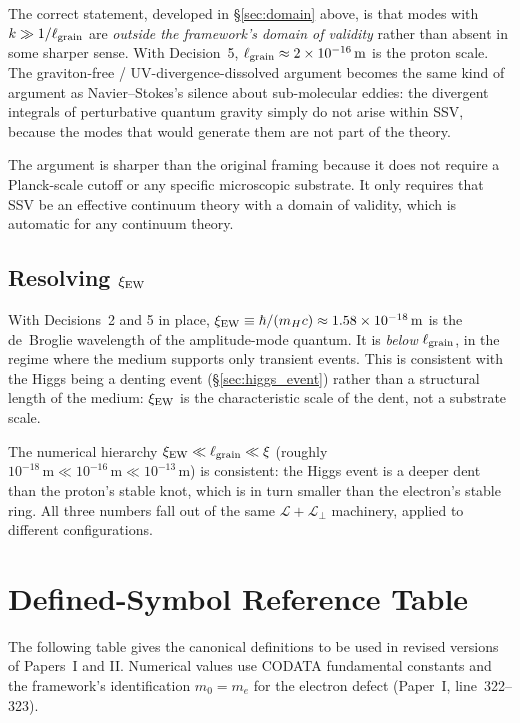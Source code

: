 \documentclass[11pt,a4paper]{article}
\begin{document}
The correct statement, developed in \S\ref{sec:domain} above, is that
modes with $k \gg 1/\ell_{\rm grain}$ are \emph{outside the framework's
domain of validity} rather than absent in some sharper sense.  With
Decision~5, $\ell_{\rm grain} \approx 2\times 10^{-16}\,\mathrm{m}$ is
the proton scale.  The graviton-free / UV-divergence-dissolved argument
becomes the same kind of argument as Navier--Stokes's silence about
sub-molecular eddies: the divergent integrals of perturbative quantum
gravity simply do not arise within SSV, because the modes that would
generate them are not part of the theory.

The argument is sharper than the original framing because it does not
require a Planck-scale cutoff or any specific microscopic substrate.
It only requires that SSV be an effective continuum theory with a
domain of validity, which is automatic for any continuum theory.

\subsection{Resolving $\xi_{\rm EW}$}

With Decisions~2 and 5 in place, $\xi_{\rm EW} \equiv \hbar/(m_H c)
\approx 1.58\times 10^{-18}\,\mathrm{m}$ is the de~Broglie wavelength of
the amplitude-mode quantum.  It is \emph{below} $\ell_{\rm grain}$, in
the regime where the medium supports only transient events.  This is
consistent with the Higgs being a denting event (\S\ref{sec:higgs_event})
rather than a structural length of the medium: $\xi_{\rm EW}$ is the
characteristic scale of the dent, not a substrate scale.

The numerical hierarchy $\xi_{\rm EW} \ll \ell_{\rm grain} \ll \xi$
(roughly $10^{-18}\,\mathrm{m} \ll 10^{-16}\,\mathrm{m} \ll
10^{-13}\,\mathrm{m}$) is consistent: the Higgs event is a deeper
dent than the proton's stable knot, which is in turn smaller than the
electron's stable ring.  All three numbers fall out of the same
$\mathcal{L}+\mathcal{L}_\perp$ machinery, applied to different
configurations.

\section{Defined-Symbol Reference Table}

The following table gives the canonical definitions to be used in revised
versions of Papers~I and II.  Numerical values use CODATA fundamental
constants and the framework's identification $m_0 = m_e$ for the electron
defect (Paper~I, line~322--323).
\end{document}
